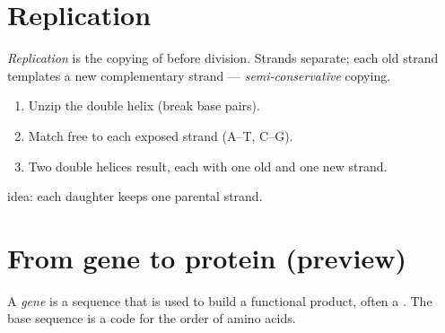 \section{Replication}

\begin{definition}\label{def:g9:dna:rep}
\emph{Replication} is the copying of  before
 division. Strands separate; each old strand templates a new
complementary strand --- \emph{semi-conservative} copying.
\end{definition}

\begin{method}\label{met:g9:dna:rep}
\begin{enumerate}
  \item Unzip the double helix (break base pairs).
  \item Match free  to each exposed strand (A--T, C--G).
  \item Two double helices result, each with one old and one new strand.
\end{enumerate}
\end{method}

\begin{omfigure}

{\small {} idea: each daughter  keeps one parental
strand.}
\end{omfigure}

\section{From gene to protein (preview)}

\begin{definition}\label{def:g9:dna:gene}
A \emph{gene} is a  sequence that is used to build a
functional product, often a . The base sequence is a code for the
order of amino acids.
\end{definition}

